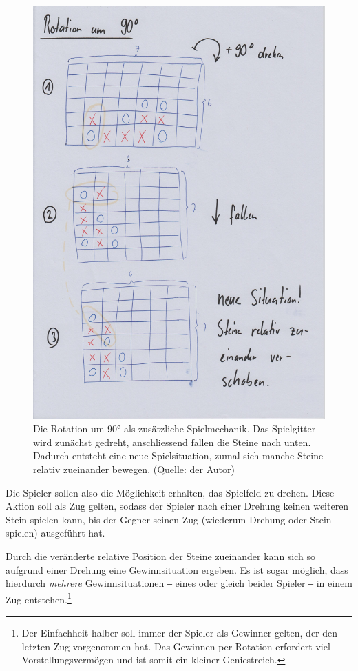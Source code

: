 \documentclass[a4paper,11pt,hidelinks]{scrartcl}
\begin{document}
\begin{figure}
    \centering
    \includegraphics[width=0.9\linewidth]{pics/rotation-papier.jpg}
    \caption{Die Rotation um 90° als zusätzliche Spielmechanik. Das Spielgitter wird zunächst gedreht, anschliessend fallen die Steine nach unten. Dadurch entsteht eine neue Spielsituation, zumal sich manche Steine relativ zueinander bewegen. (Quelle: der Autor)}
    \label{fig:rotation}
\end{figure}

Die Spieler sollen also die Möglichkeit erhalten, das Spielfeld zu drehen. Diese Aktion soll als Zug gelten, sodass der Spieler nach einer Drehung keinen weiteren Stein spielen kann, bis der Gegner seinen Zug (wiederum Drehung oder Stein spielen) ausgeführt hat.

Durch die veränderte relative Position der Steine zueinander kann sich so aufgrund einer Drehung eine Gewinnsituation ergeben. Es ist sogar möglich, dass hierdurch \textit{mehrere} Gewinnsituationen ‒ eines oder gleich beider Spieler ‒ in einem Zug entstehen.\footnote{Der Einfachheit halber soll immer der Spieler als Gewinner gelten, der den letzten Zug vorgenommen hat. Das Gewinnen per Rotation erfordert viel Vorstellungsvermögen und ist somit ein kleiner Geniestreich.}
\end{document}

